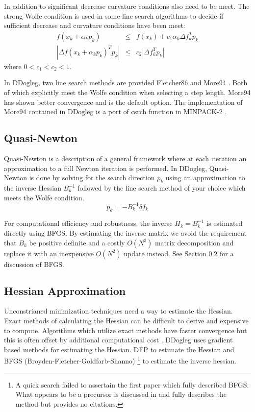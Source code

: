 \documentclass[peerreview,compsoc,onecolumn]{IEEEtran}
\begin{document}
In addition to significant decrease curvature conditions also need to be meet. The strong Wolfe condition is used in some line search algorithms to decide if sufficient decrease and curvature conditions have been meet:
\begin{eqnarray}
f(x_k + \alpha_k p_k) &\le& f(x_k) + c_1 \alpha_k \Delta f^T_k p_k \\
|\Delta f(x_k + \alpha_k p_k)^T p_k| &\le& c_2 |\Delta f_k^T p_k|
\end{eqnarray}
where $0 < c_1 < c_2 < 1$.

In DDogleg, two line search methods are provided Fletcher86 \cite{Fletcher1986} and More94 \cite{More1994}. Both of which explicitly meet the Wolfe condition when selecting a step length. More94 has shown better convergence and is the default option. The implementation of More94 contained in DDogleg is a port of csrch function in MINPACK-2 \cite{MINPACK}.

\subsection{Quasi-Newton}

Quasi-Newton is a description of a general framework where at each iteration an approximation to a full Newton iteration is performed. In DDogleg, Quasi-Newton is done by solving for the search direction $p_k$ using an approximation to the inverse Hessian $B_k^{-1}$ followed by the line search method of your choice which meets the Wolfe condition.
\begin{equation}
p_k = -B_k^{-1}\delta f_k
\end{equation}

For computational efficiency and robustness, the inverse $H_k = B_k^{-1}$ is estimated directly using BFGS. By estimating the inverse matrix we avoid the requirement that $B_k$ be positive definite and a costly $O(N^3)$ matrix decomposition and replace it with an inexpensive $O(N^2)$ update instead. See Section \ref{sec:hessian_approx} for a discussion of BFGS. 
 
\subsection{Hessian Approximation}
\label{sec:hessian_approx}

Unconstrianed minimization techniques need a way to estimate the Hessian. Exact methods of calculating the Hessian can be difficult to derive and expensive to compute. Algorithms which utilize exact methods have faster convergence but this is often offset by additional computational cost \cite{numopt2006}. DDogleg uses gradient based methods for estimating the Hessian. DFP \cite{davidonDFP} to estimate the Hessian and BFGS (Broyden-Fletcher-Goldfarb-Shanno) \cite{fletcher1987,numopt2006}\footnote{A quick search failed to assertain the first paper which fully described BFGS. What appears to be a precursor is discussed in \cite{fletcher1987} and \cite{numopt2006} fully describes the method but provides no citations.} to estimate the inverse hessian.
\end{document}
